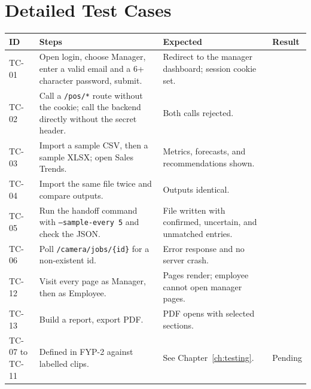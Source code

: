 \chapter{Detailed Test Cases}
\label{app:tests}
\begin{longtable}{P{0.09\textwidth}P{0.35\textwidth}P{0.3\textwidth}P{0.14\textwidth}}
\toprule
ID & Steps & Expected & Result\\
\midrule
\endhead
TC-01 & Open login, choose Manager, enter a valid email and a 6+ character password, submit. & Redirect to the manager dashboard; session cookie set. & \todo{}\\
TC-02 & Call a \texttt{/pos/*} route without the cookie; call the backend directly without the secret header. & Both calls rejected. & \todo{}\\
TC-03 & Import a sample CSV, then a sample XLSX; open Sales Trends. & Metrics, forecasts, and recommendations shown. & \todo{}\\
TC-04 & Import the same file twice and compare outputs. & Outputs identical. & \todo{}\\
TC-05 & Run the handoff command with \texttt{--sample-every 5} and check the JSON. & File written with confirmed, uncertain, and unmatched entries. & \todo{}\\
TC-06 & Poll \texttt{/camera/jobs/\{id\}} for a non-existent id. & Error response and no server crash. & \todo{}\\
TC-12 & Visit every page as Manager, then as Employee. & Pages render; employee cannot open manager pages. & \todo{}\\
TC-13 & Build a report, export PDF. & PDF opens with selected sections. & \todo{}\\
TC-07 to TC-11 & Defined in FYP-2 against labelled clips. & See Chapter~\ref{ch:testing}. & Pending\\
\bottomrule
\end{longtable}


